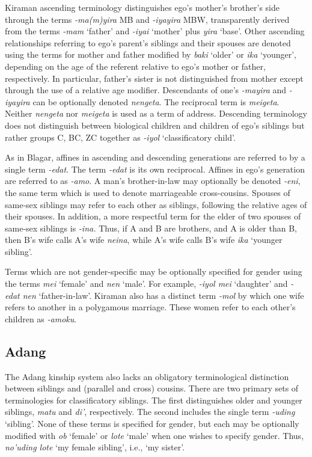 Kiraman ascending terminology distinguishes ego's mother's brother's side through the terms \textit{-ma(m)yira} MB and \textit{-iyayira} MBW, transparently derived from the terms \textit{-mam} `father' and \textit{-iyai} `mother' plus \textit{yira} `base'. Other ascending relationships referring to ego's parent's siblings and their spouses are denoted using the terms for mother and father modified by \textit{baki} `older' or \textit{ika} `younger', depending on the age of the referent relative to ego's mother or father, respectively. In particular, father's sister is not distinguished from mother except through the use of a relative age modifier. Descendants of one's \textit{-mayira} and \textit{-iyayira} can be optionally denoted \textit{nengeta}. The reciprocal term is \textit{meigeta}. Neither \textit{nengeta} nor \textit{meigeta} is used as a term of address. Descending terminology does not distinguish between biological children and children of ego's siblings but rather groups C, BC, ZC together as \textit{-iyol} `classificatory child'.

As in Blagar, affines in ascending and descending generations are referred to by a single term \textit{-edat}. The term \textit{-edat} is its own reciprocal. Affines in ego's generation are referred to as \textit{-amo}. A man's brother-in-law may optionally be denoted \textit{-eni}, the same term which is used to denote marriageable cross-cousins. Spouses of same-sex siblings may refer to each other as siblings, following the relative ages of their spouses. In addition, a more respectful term for the elder of two spouses of same-sex siblings is \textit{-ina.} Thus, if A and B are brothers, and A is older than B, then B's wife calls A's wife \textit{neina}, while A's wife calls B's wife \textit{ika} `younger sibling'. 

 



Terms which are not gender-specific may be optionally specified for gender using the terms \textit{mei} `female' and \textit{nen} `male'. For example, \textit{-iyol mei} `daughter' and \textit{{}-edat nen} `father-in-law'. Kiraman also has a distinct term \textit{-mol} by which one wife refers to another in a polygamous marriage. These women refer to each other's children as \textit{-amoku}. 


\subsection{Adang}\label{sect_adang}
The Adang kinship system also lacks an obligatory terminological distinction between siblings and (parallel and cross) cousins. There are two primary sets of terminologies for classificatory siblings. The first distinguishes older and younger siblings, \textit{matu} and \textit{di'}, respectively. The second includes the single term \textit{-uding} `sibling'. None of these terms is specified for gender, but each may be optionally modified with \textit{ob} `female' or \textit{lote} `male' when one wishes to specify gender. Thus, \textit{no'uding lote} `my female sibling', i.e., `my sister'. 

